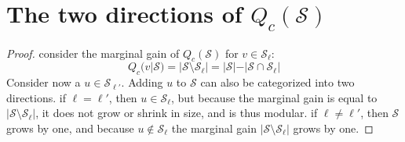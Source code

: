 \documentclass{article}
\def \setS{\mathcal{S}}
\begin{document}
\section{The two directions of $Q_c(\setS)$}
\label{app:Qc}
\begin{proof}
    consider the marginal gain of $Q_c(\setS)$ for $v\in\setS_\ell$:
    \begin{equation}
        Q_c(v|\setS) = |\setS \setminus \setS_\ell| = |\setS| - |\setS \cap \setS_\ell|
    \end{equation}
    Consider now a $u\in \setS_{\ell'}$. Adding $u$ to $\setS$ can also be categorized into two directions. if $\ell = \ell'$, then $u\in\setS_\ell$, but because the marginal gain is equal to $|\setS \setminus \setS_\ell|$, it does not grow or shrink in size, and is thus modular. if $\ell \not= \ell'$, then $\setS$ grows by one, and because $u \not \in \setS_\ell$ the marginal gain $|\setS \setminus \setS_\ell|$ grows by one.
\end{proof}
\end{document}
